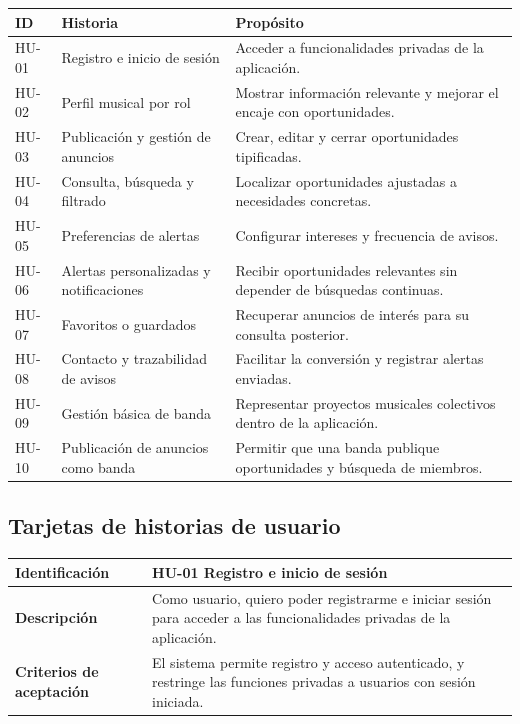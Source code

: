 \documentclass[12pt,a4paper]{report}
\begin{document}
\renewcommand{\arraystretch}{1.15}
\begin{longtable}{|L{1.8cm}|L{4.7cm}|L{7.2cm}|}
\hline
\textbf{ID} & \textbf{Historia} & \textbf{Propósito} \\
\hline
HU-01 & Registro e inicio de sesión & Acceder a funcionalidades privadas de la aplicación. \\
\hline
HU-02 & Perfil musical por rol & Mostrar información relevante y mejorar el encaje con oportunidades. \\
\hline
HU-03 & Publicación y gestión de anuncios & Crear, editar y cerrar oportunidades tipificadas. \\
\hline
HU-04 & Consulta, búsqueda y filtrado & Localizar oportunidades ajustadas a necesidades concretas. \\
\hline
HU-05 & Preferencias de alertas & Configurar intereses y frecuencia de avisos. \\
\hline
HU-06 & Alertas personalizadas y notificaciones & Recibir oportunidades relevantes sin depender de búsquedas continuas. \\
\hline
HU-07 & Favoritos o guardados & Recuperar anuncios de interés para su consulta posterior. \\
\hline
HU-08 & Contacto y trazabilidad de avisos & Facilitar la conversión y registrar alertas enviadas. \\
\hline
HU-09 & Gestión básica de banda & Representar proyectos musicales colectivos dentro de la aplicación. \\
\hline
HU-10 & Publicación de anuncios como banda & Permitir que una banda publique oportunidades y búsqueda de miembros. \\
\hline
\end{longtable}

\subsection{Tarjetas de historias de usuario}

\begin{center}
\begin{tabular}{|L{2.9cm}|L{10cm}|}
\hline
\textbf{Identificación} & HU-01 Registro e inicio de sesión \\
\hline
\textbf{Descripción} & Como usuario, quiero poder registrarme e iniciar sesión para acceder a las funcionalidades privadas de la aplicación. \\
\hline
\textbf{Criterios de aceptación} & El sistema permite registro y acceso autenticado, y restringe las funciones privadas a usuarios con sesión iniciada. \\
\hline
\end{tabular}
\end{center}
\end{document}
